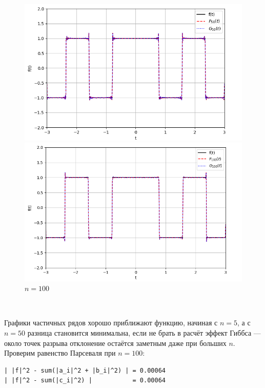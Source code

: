 \documentclass[a4paper]{article}
\begin{document}
\begin{figure}[H]
    \begin{minipage}{0.5\textwidth}
        \centering \includegraphics[width=\textwidth]{even_func/50.png}
        \caption{$n = 50$}
    \end{minipage}
    \begin{minipage}{0.5\textwidth}
        \centering \includegraphics[width=\textwidth]{even_func/100.png}
        \caption{$n = 100$}
    \end{minipage}
\end{figure}\noindent\

Графики частичных рядов хорошо приближают функцию, начиная с $n=5$, а с $n=50$ разница становится минимальна, если не брать в расчёт эффект Гиббса --- около точек разрыва отклонение остаётся заметным даже при больших $n$.\\[0.5em]
Проверим равенство Парсеваля при $n = 100$:
\begin{lstlisting}[caption={Равенство Парсеваля при $n=100$}, numbers=none]
| |f|^2 - sum(|a_i|^2 + |b_i|^2) | = 0.00064
| |f|^2 - sum(|c_i|^2) |           = 0.00064
\end{lstlisting}
\end{document}
